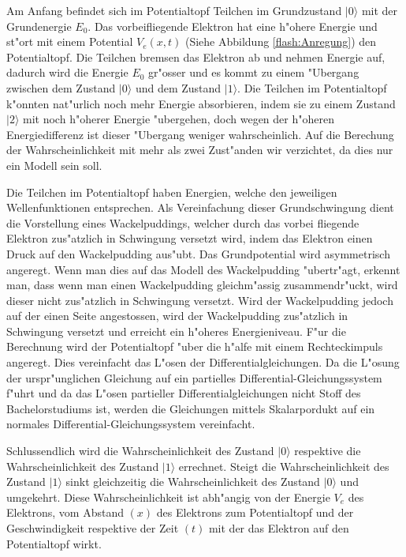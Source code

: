 \begin{refsection}
Am Anfang befindet sich im Potentialtopf Teilchen im Grundzustand $|0\rangle$
mit der Grundenergie $E_{0}$.
Das vorbeifliegende Elektron hat eine h"ohere Energie und st"ort mit
einem Potential $V_{e}(x,t)$ (Siehe Abbildung \ref{flash:Anregung})
den Potentialtopf.
Die Teilchen bremsen das Elektron ab und nehmen Energie auf, dadurch
wird die Energie $E_{0}$ gr"osser und es kommt zu einem "Ubergang 
zwischen dem Zustand $|0\rangle$ und dem Zustand $|1\rangle$.
Die Teilchen im Potentialtopf k"onnten nat"urlich noch mehr Energie
absorbieren, indem sie zu einem Zustand $|2\rangle$ mit noch h"oherer
Energie "ubergehen, doch wegen der h"oheren Energiedifferenz ist dieser
"Ubergang weniger wahrscheinlich.
Auf die Berechung der Wahrscheinlichkeit mit mehr als zwei Zust"anden
wir verzichtet, da dies nur ein Modell sein soll.

Die Teilchen im Potentialtopf haben Energien, welche den jeweiligen 
Wellenfunktionen entsprechen.
Als Vereinfachung dieser Grundschwingung dient die Vorstellung eines
Wackelpuddings, welcher durch das vorbei fliegende Elektron zus"atzlich
in Schwingung versetzt wird, indem das Elektron einen Druck auf den
Wackelpudding aus"ubt.
Das Grundpotential wird asymmetrisch angeregt.
Wenn man dies auf das Modell des Wackelpudding "ubertr"agt, erkennt man,
dass wenn man einen Wackelpudding gleichm"assig zusammendr"uckt, wird
dieser nicht zus"atzlich in Schwingung versetzt.
Wird der Wackelpudding jedoch auf der einen Seite angestossen, wird der
Wackelpudding zus"atzlich in Schwingung versetzt und erreicht ein
h"oheres Energieniveau.
F"ur die Berechnung wird der Potentialtopf "uber die h"alfe mit einem
Rechteckimpuls angeregt.
Dies vereinfacht das L"osen der Differentialgleichungen.
Da die L"osung der urspr"unglichen Gleichung auf ein partielles
Differential-Gleichungssystem f"uhrt und da das L"osen partieller
Differentialgleichungen nicht Stoff des Bachelorstudiums ist, werden
die Gleichungen mittels Skalarpordukt auf ein normales
Differential-Gleichungssystem vereinfacht.

Schlussendlich wird die Wahrscheinlichkeit des Zustand $|0\rangle$ 
respektive die Wahrscheinlichkeit des Zustand $|1\rangle$ errechnet.
Steigt die Wahrscheinlichkeit des Zustand $|1\rangle$ sinkt gleichzeitig
die Wahrscheinlichkeit des Zustand $|0\rangle$ und umgekehrt.
Diese Wahrscheinlichkeit ist abh"angig von der Energie $V_{e}$ 
des Elektrons, vom Abstand $(x)$ des Elektrons zum Potentialtopf und der 
Geschwindigkeit respektive der Zeit $(t)$ mit der das Elektron auf den 
Potentialtopf wirkt.


\end{refsection}
